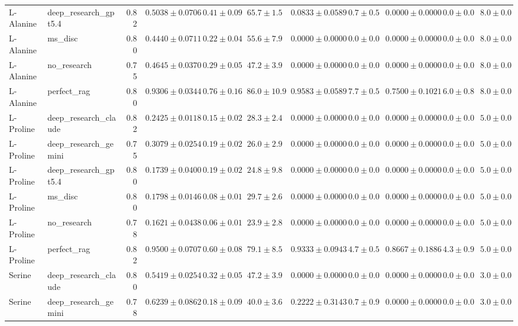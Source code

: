 \begin{table}[htbp]
\begin{tabular}{llrrrrrrrrr}
L-Alanine & deep_research_gpt5.4 & 0.82 & $0.5038 \pm 0.0706$ & $0.41 \pm 0.09$ & $65.7 \pm 1.5$ & $0.0833 \pm 0.0589$ & $0.7 \pm 0.5$ & $0.0000 \pm 0.0000$ & $0.0 \pm 0.0$ & $8.0 \pm 0.0$ \\
L-Alanine & ms_disc & 0.80 & \cellcolor{red!25}$0.4440 \pm 0.0711$ & $0.22 \pm 0.04$ & $55.6 \pm 7.9$ & $0.0000 \pm 0.0000$ & $0.0 \pm 0.0$ & $0.0000 \pm 0.0000$ & $0.0 \pm 0.0$ & $8.0 \pm 0.0$ \\
L-Alanine & no_research & 0.75 & $0.4645 \pm 0.0370$ & $0.29 \pm 0.05$ & $47.2 \pm 3.9$ & $0.0000 \pm 0.0000$ & $0.0 \pm 0.0$ & $0.0000 \pm 0.0000$ & $0.0 \pm 0.0$ & $8.0 \pm 0.0$ \\
L-Alanine & perfect_rag & 0.80 & \cellcolor{green!25}$0.9306 \pm 0.0344$ & $0.76 \pm 0.16$ & $86.0 \pm 10.9$ & $0.9583 \pm 0.0589$ & $7.7 \pm 0.5$ & $0.7500 \pm 0.1021$ & $6.0 \pm 0.8$ & $8.0 \pm 0.0$ \\
\midrule
L-Proline & deep_research_claude & 0.82 & $0.2425 \pm 0.0118$ & $0.15 \pm 0.02$ & $28.3 \pm 2.4$ & $0.0000 \pm 0.0000$ & $0.0 \pm 0.0$ & $0.0000 \pm 0.0000$ & $0.0 \pm 0.0$ & $5.0 \pm 0.0$ \\
L-Proline & deep_research_gemini & 0.75 & $0.3079 \pm 0.0254$ & $0.19 \pm 0.02$ & $26.0 \pm 2.9$ & $0.0000 \pm 0.0000$ & $0.0 \pm 0.0$ & $0.0000 \pm 0.0000$ & $0.0 \pm 0.0$ & $5.0 \pm 0.0$ \\
L-Proline & deep_research_gpt5.4 & 0.80 & $0.1739 \pm 0.0400$ & $0.19 \pm 0.02$ & $24.8 \pm 9.8$ & $0.0000 \pm 0.0000$ & $0.0 \pm 0.0$ & $0.0000 \pm 0.0000$ & $0.0 \pm 0.0$ & $5.0 \pm 0.0$ \\
L-Proline & ms_disc & 0.80 & $0.1798 \pm 0.0146$ & $0.08 \pm 0.01$ & $29.7 \pm 2.6$ & $0.0000 \pm 0.0000$ & $0.0 \pm 0.0$ & $0.0000 \pm 0.0000$ & $0.0 \pm 0.0$ & $5.0 \pm 0.0$ \\
L-Proline & no_research & 0.78 & \cellcolor{red!25}$0.1621 \pm 0.0438$ & $0.06 \pm 0.01$ & $23.9 \pm 2.8$ & $0.0000 \pm 0.0000$ & $0.0 \pm 0.0$ & $0.0000 \pm 0.0000$ & $0.0 \pm 0.0$ & $5.0 \pm 0.0$ \\
L-Proline & perfect_rag & 0.82 & \cellcolor{green!25}$0.9500 \pm 0.0707$ & $0.60 \pm 0.08$ & $79.1 \pm 8.5$ & $0.9333 \pm 0.0943$ & $4.7 \pm 0.5$ & $0.8667 \pm 0.1886$ & $4.3 \pm 0.9$ & $5.0 \pm 0.0$ \\
\midrule
Serine & deep_research_claude & 0.80 & $0.5419 \pm 0.0254$ & $0.32 \pm 0.05$ & $47.2 \pm 3.9$ & $0.0000 \pm 0.0000$ & $0.0 \pm 0.0$ & $0.0000 \pm 0.0000$ & $0.0 \pm 0.0$ & $3.0 \pm 0.0$ \\
Serine & deep_research_gemini & 0.78 & $0.6239 \pm 0.0862$ & $0.18 \pm 0.09$ & $40.0 \pm 3.6$ & $0.2222 \pm 0.3143$ & $0.7 \pm 0.9$ & $0.0000 \pm 0.0000$ & $0.0 \pm 0.0$ & $3.0 \pm 0.0$ \\

\end{tabular}
\end{table}
